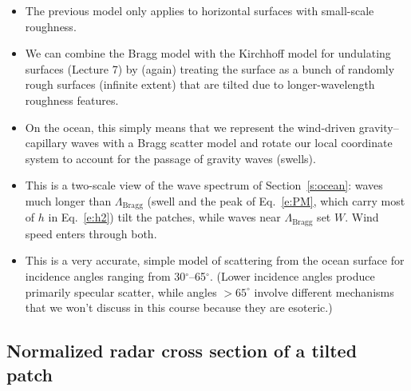 \documentclass[11pt, oneside]{article}
\begin{document}
\begin{itemize}
	\item The previous model only applies to horizontal surfaces with small-scale roughness.
	\item We can combine the Bragg model with the Kirchhoff model for undulating surfaces (Lecture 7) by (again) treating the surface as a bunch of randomly rough surfaces (infinite extent) that are tilted due to longer-wavelength roughness features.
	\item On the ocean, this simply means that we represent the wind-driven gravity--capillary waves with a Bragg scatter model and rotate our local coordinate system to account for the passage of gravity waves (swells).
	\item This is a two-scale view of the wave spectrum of Section~\ref{s:ocean}: waves much longer than $\Lambda_\mathrm{Bragg}$ (swell and the peak of Eq.~\ref{e:PM}, which carry most of $h$ in Eq.~\ref{e:h2}) tilt the patches, while waves near $\Lambda_\mathrm{Bragg}$ set $W$. Wind speed enters through both.
	\item This is a very accurate, simple model of scattering from the ocean surface for incidence angles ranging from 30$^\circ$--65$^\circ$. (Lower incidence angles produce primarily specular scatter, while angles $>65^\circ$ involve different mechanisms that we won't discuss in this course because they are esoteric.)
\end{itemize}

\subsection{Normalized radar cross section of a tilted patch}
\end{document}
